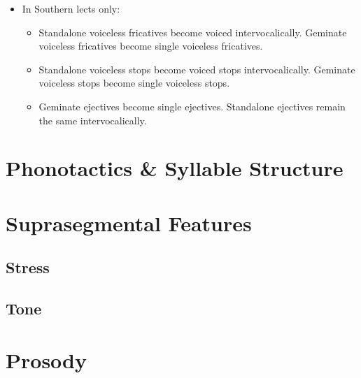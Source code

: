 \begin{itemize}
\begin{itemize}
    \end{itemize}
    \item In Southern lects only:
    \begin{itemize}
        \item Standalone voiceless fricatives become voiced intervocalically. Geminate voiceless fricatives become single voiceless fricatives.
        \item Standalone voiceless stops become voiced stops intervocalically. Geminate voiceless stops become single voiceless stops.
        \item Geminate ejectives become single ejectives. Standalone ejectives remain the same intervocalically.
    \end{itemize}
\end{itemize}

\section{Phonotactics \& Syllable Structure}

\section{Suprasegmental Features}

\subsection{Stress}


\subsection{Tone}

\section{Prosody}

